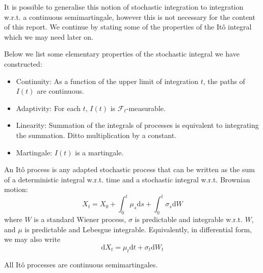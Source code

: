 It is possible to generalise this notion of stochastic integration to integration 
w.r.t. a continuous semimartingale, however this is not necessary for the content of 
this report. We continue by stating some of the properties of the It\^{o} integral
which we may need later on.

\begin{remark}
    Below we list some elementary properties of the stochastic integral we have
    constructed:
    \begin{itemize}
        \item Continuity: As a function of the upper limit of integration $t$, the 
        paths of $I(t)$ are continuous.
        \item Adaptivity: For each $t$, $I(t)$ is $\mathcal{F}_t$-measurable.
        \item Linearity: Summation of the integrals of processes is equivalent to
        integrating the summation. Ditto multiplication by a constant.
        \item Martingale: $I(t)$ is a martingale.
    \end{itemize}
\end{remark}

\begin{definition}[It\^{o} Processes]
    An It\^{o} process is any adapted stochastic process that can be written as the sum of a 
    deterministic integral w.r.t. time and a stochastic integral w.r.t. Brownian motion:
    \begin{equation}
        X_t=X_0+\int_0^t\mu_s\mathrm ds+\int_0^t\sigma_s\mathrm dW
    \end{equation}
    where $W$ is a standard Wiener process, $\sigma$ is predictable and integrable w.r.t. $W$,
    and $\mu$ is predictable and Lebesgue integrable. Equivalently, in differential form, we 
    may also write
    \begin{equation}
        \mathrm dX_t=\mu_t\mathrm dt + \sigma_t\mathrm dW_t
    \end{equation}
\end{definition}

\begin{remark}
    All It\^{o} processes are continuous semimartingales.
\end{remark}

